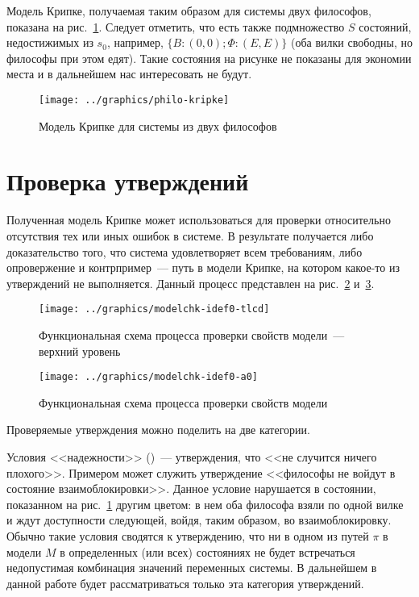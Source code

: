 Модель Крипке, получаемая таким образом для системы двух философов, показана на
рис.~\ref{fig:philo2-kripke}. Следует отметить, что есть также подмножество $S$ состояний,
недостижимых из $s_0$, например, $\{B: (0, 0); \Phi: (E, E)\}$ (оба вилки свободны, но
философы при этом едят). Такие состояния на рисунке не показаны для экономии места и в
дальнейшем нас интересовать не будут.

\begin{figure}[ht]
  \centering
  \texttt{[image: ../graphics/philo-kripke]}
  \caption{Модель Крипке для системы из двух философов}
  \label{fig:philo2-kripke}
\end{figure}

\section{Проверка утверждений}
\label{sec:kripke-verification}

Полученная модель Крипке может использоваться для проверки относительно отсутствия тех или
иных ошибок в системе. В результате получается либо доказательство того, что система
удовлетворяет всем требованиям, либо опровержение и контрпример~--- путь в модели Крипке,
на котором какое-то из утверждений не выполняется. Данный процесс представлен на
рис.~\ref{fig:modelchk-idef0-tlcd} и~\ref{fig:modelchk-idef0-a0}.

\begin{figure}[htb]
  \centering
  \texttt{[image: ../graphics/modelchk-idef0-tlcd]}
  \caption{Функциональная схема процесса проверки свойств модели~--- верхний уровень}
  \label{fig:modelchk-idef0-tlcd}
\end{figure}

\begin{figure}[htb]
  \centering
  \texttt{[image: ../graphics/modelchk-idef0-a0]}
  \caption{Функциональная схема процесса проверки свойств модели}
  \label{fig:modelchk-idef0-a0}
\end{figure}

Проверяемые утверждения можно поделить на две категории.  

Условия <<надежности>> ()~--- утверждения, что <<не случится ничего
плохого>>. Примером может служить утверждение <<философы не войдут в состояние
взаимоблокировки>>. Данное условие нарушается в состоянии, показанном на
рис.~\ref{fig:philo2-kripke} другим цветом: в нем оба философа взяли по одной вилке и ждут
доступности следующей, войдя, таким образом, во взаимоблокировку. Обычно такие условия
сводятся к утверждению, что ни в одном из путей $\pi$ в модели $M$ в определенных (или
всех) состояниях не будет встречаться недопустимая комбинация значений переменных
системы. В дальнейшем в данной работе будет рассматриваться только эта категория
утверждений.

